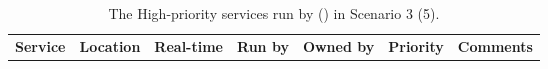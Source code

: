 \begin{center}
\begin{table}
\begin{tabular}{p{\mycolwidth} p{\mycolwidth} l l l l p{\mycolwidth}}
{\bf \tiny Service}  & {\bf \tiny Location} & \bf {\tiny Real-time} & {\bf \tiny Run by} & \bf {\tiny Owned by} & {\bf \tiny Priority} & {\bf \tiny Comments} \\

\end{tabular}
\caption{The High-priority \einfra services run by \EC (\nnt) in Scenario 3 (5).
\label{tab:services:s3}}
\end{table}
\end{center}
